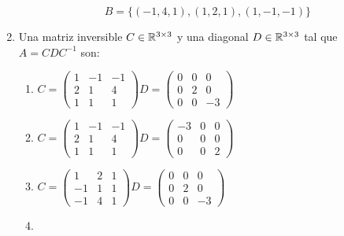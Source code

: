 \documentclass[../practica.root.tex]{subfiles}
\begin{document}
\begin{enumerate}
          \[ \boxed{B = \{ (-1,4,1),(1,2,1),(1,-1,-1) \}} \]
    \item Una matriz inversible \( C \in \mathbb{R}^{3\times3} \) y una diagonal \( D \in \mathbb{R}^{3\times3} \) tal que \( A = CDC^{-1} \) son:
          \begin{enumerate}
              \item \( C = \begin{pmatrix}
                        1 & -1 & -1 \\
                        2 & 1  & 4  \\
                        1 & 1  & 1
                    \end{pmatrix}
                    D = \begin{pmatrix}
                        0 & 0 & 0  \\
                        0 & 2 & 0  \\
                        0 & 0 & -3
                    \end{pmatrix} \)
              \item \( C = \begin{pmatrix}
                        1 & -1 & -1 \\
                        2 & 1  & 4  \\
                        1 & 1  & 1
                    \end{pmatrix}
                    D = \begin{pmatrix}
                        -3 & 0 & 0 \\
                        0  & 0 & 0 \\
                        0  & 0 & 2
                    \end{pmatrix} \)
              \item \( C = \begin{pmatrix}
                        1  & 2 & 1 \\
                        -1 & 1 & 1 \\
                        -1 & 4 & 1
                    \end{pmatrix}
                    D = \begin{pmatrix}
                        0 & 0 & 0  \\
                        0 & 2 & 0  \\
                        0 & 0 & -3
                    \end{pmatrix} \)
              \item {}
\end{enumerate}
\end{enumerate}
\end{document}
